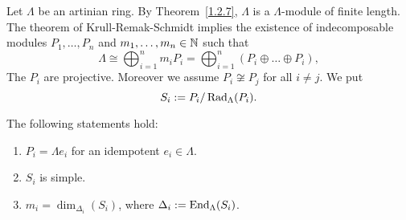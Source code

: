 %




\begin{definition}
Let $\Lambda$ be an artinian ring. By Theorem~\ref{1.2.7}, $\Lambda$ is a $\Lambda$-module of finite length. The theorem of Krull-Remak-Schmidt implies the existence of indecomposable modules $P_1,\dots,P_n$ and $m_1,\dots,m_n\in\mathbb{N}$ such that
\[
\Lambda \cong \bigoplus_{i=1}^n m_i P_i = \bigoplus_{i=1}^n (P_i\oplus \dots \oplus P_i),
\]
The $P_i$ are projective. Moreover we assume $P_i\not\cong P_j$ for all $i\neq j$. We put
\[
S_i := P_i/\operatorname{Rad}_\Lambda(P_i).
\]
\end{definition}


\begin{lemma}\label{1.4.6}
The following statements hold:
\begin{enumerate}
\item $P_i=\Lambda e_i$ for an idempotent $e_i\in \Lambda$.
\item $S_i$ is simple.
\item $m_i=\dim_{\Delta_i}(S_i)$, where $\Delta_i:=\operatorname{End}_\Lambda(S_i)$.
\end{enumerate}
\end{lemma}


